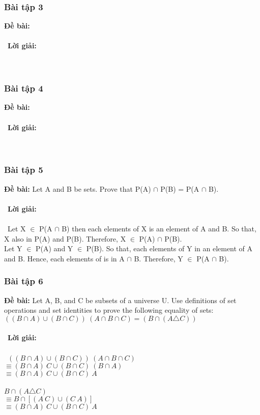 \documentclass[a4paper]{article}
\begin{document}
\begin{enumerate}
\subsubsection{Bài tập 3}
\textbf{Đề bài:} 
\\\ \\\
\textbf{Lời giải:} \\\ \\\
\clearpage
\subsubsection{Bài tập 4}
\textbf{Đề bài:} 
\\\ \\\
\textbf{Lời giải:} \\\ \\\
\clearpage
\subsubsection{Bài tập 5} 
\textbf{Đề bài:} Let A and B be sets. Prove that P(A) $\cap$ P(B) = P(A $\cap$ B).
\\\ \\\
\textbf{Lời giải:} \\\ \\\
Let X $\in$ P(A $\cap$ B) then each elements of X is an element of A and B. So that, X also in P(A) and P(B). Therefore, X $\in$ P(A) $\cap$ P(B).\\
Let Y $\in$ P(A) and Y $\in$ P(B). So that, each elements of Y in an element of A and B. Hence, each elements of  is in A $\cap$ B. Therefore, Y $\in$ P(A $\cap$ B).
\clearpage
\subsubsection{Bài tập 6} 
\textbf{Đề bài:} Let A, B, and C be subsets of a universe U. Use definitions of set operations and set identities to prove the following equality of sets:\\
$((B \cap A) \cup (B \cap C)) \ (A \cap B \cap C) = (B \cap (A \triangle C))$
\\\ \\\
\textbf{Lời giải:} \\\ \\\
$((B \cap A) \cup (B \cap C)) \ (A \cap B \cap C)$\\
$\equiv (B \cap A) \ C \cup (B \cap C) \ (B \cap A)$\\
$\equiv (B \cap A) \ C \cup (B \cap C) \ A$\\
\\
$B \cap (A \triangle C)$\\
$\equiv B \cap [(A \ C) \cup (C \ A)]$\\
$\equiv (B \cap A) \ C \cup (B \cap C) \ A$\\
\clearpage

\end{enumerate}
\end{document}
